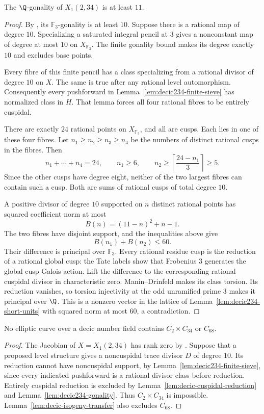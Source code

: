 \begin{lemma}\label{lem:decic234-gonality}
The $\Q$-gonality of $X_1(2,34)$ is at least $11$.
\end{lemma}
\begin{proof}
By \cite[Table~1]{NV}, its $\mathbb F_3$-gonality is at least $10$.
Suppose there is a rational map of degree $10$.
Specializing a saturated integral pencil at $3$ gives a
nonconstant map of degree at most $10$ on $X_{\mathbb F_3}$.
The finite gonality bound makes its degree exactly $10$ and
excludes base points.

Every fibre of this finite pencil has a class specializing from a
rational divisor of degree $10$ on $X$. The same is true after
any rational level automorphism. Consequently every pushforward
in Lemma~\ref{lem:decic234-finite-sieve} has normalized class in $H$.
That lemma forces all four rational fibres to be entirely cuspidal.

There are exactly $24$ rational points on $X_{\mathbb F_3}$, and
all are cusps. Each lies in one of these four fibres.
Let $n_1\geq n_2\geq n_3\geq n_4$ be the numbers of distinct
rational cusps in the fibres. Then
\[
 n_1+\cdots+n_4=24,\qquad n_1\geq6,\qquad
 n_2\geq\left\lceil\frac{24-n_1}{3}\right\rceil\geq5.
\]
Since the other cusps have degree eight, neither of the two
largest fibres can contain such a cusp. Both are sums of rational
cusps of total degree $10$.

A positive divisor of degree $10$ supported on $n$ distinct rational
points has squared coefficient norm at most
\[
 B(n)=(11-n)^2+n-1.
\]
The two fibres have disjoint support, and the inequalities above give
\[
 B(n_1)+B(n_2)\leq60.
\]
Their difference is principal over $\mathbb F_3$.
Every rational residue cusp is the reduction of a rational global
cusp: the Tate labels show that Frobenius $3$ generates the global
cusp Galois action. Lift the difference to the corresponding
rational cuspidal divisor in characteristic zero.
Manin--Drinfeld makes its class torsion. Its reduction vanishes,
so torsion injectivity at the odd unramified prime $3$ makes it
principal over $\Q$. This is a nonzero vector in the lattice of
Lemma~\ref{lem:decic234-short-units} with squared norm at most $60$,
a contradiction.
\end{proof}

\begin{proposition}\label{prop:decic234}
No elliptic curve over a decic number field contains
$C_2\times C_{34}$ or $C_{68}$.
\end{proposition}
\begin{proof}
The Jacobian of $X=X_1(2,34)$ has rank zero by
\cite[Theorem~3.1]{DEHMZ}.
Suppose that a proposed level structure gives a noncuspidal trace
divisor $D$ of degree $10$.
Its reduction cannot have noncuspidal support, by
Lemma~\ref{lem:decic234-finite-sieve}, since every indicated
pushforward is a rational divisor class before reduction.
Entirely cuspidal reduction is excluded by
Lemma~\ref{lem:decic-cuspidal-reduction} and
Lemma~\ref{lem:decic234-gonality}.
Thus $C_2\times C_{34}$ is impossible.
Lemma~\ref{lem:decic-isogeny-transfer} also excludes $C_{68}$.
\end{proof}
